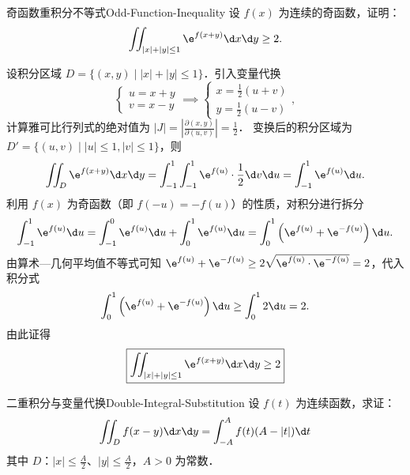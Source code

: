 \begin{problem}{奇函数重积分不等式}{Odd-Function-Inequality}
    设 $f(x)$ 为连续的奇函数，证明：
    \begin{equation}
        \iint_{|x|+|y| \le 1} \e^{f(x+y)} \d x \d y \ge 2.
    \end{equation}
\end{problem}

\begin{myproof}
    设积分区域 $D = \{ (x, y) \mid |x| + |y| \le 1 \}$．引入变量代换
    \begin{equation}
        \begin{cases} u = x + y \\ v = x - y \end{cases} \implies \begin{cases} x = \frac{1}{2}(u + v) \\ y = \frac{1}{2}(u - v) \end{cases},
    \end{equation}
    计算雅可比行列式的绝对值为 $|J| = \left| \frac{\partial(x, y)}{\partial(u, v)} \right| = \frac{1}{2}$．
    变换后的积分区域为 $D' = \{ (u, v) \mid |u| \le 1, |v| \le 1 \}$，则
    \begin{equation}
        \iint_D \e^{f(x+y)} \d x \d y = \int_{-1}^1 \int_{-1}^1 \e^{f(u)} \cdot \frac{1}{2} \d v \d u = \int_{-1}^1 \e^{f(u)} \d u.
    \end{equation}
    利用 $f(x)$ 为奇函数（即 $f(-u) = -f(u)$）的性质，对积分进行拆分
    \begin{equation}
        \int_{-1}^1 \e^{f(u)} \d u = \int_{-1}^0 \e^{f(u)} \d u + \int_0^1 \e^{f(u)} \d u = \int_0^1 \left( \e^{f(u)} + \e^{-f(u)} \right) \d u.
    \end{equation}
    由算术—几何平均值不等式可知 $\e^{f(u)} + \e^{-f(u)} \ge 2\sqrt{\e^{f(u)} \cdot \e^{-f(u)}} = 2$，代入积分式
    \begin{equation}
        \int_0^1 \left( \e^{f(u)} + \e^{-f(u)} \right) \d u \ge \int_0^1 2 \d u = 2.
    \end{equation}
    由此证得
    \begin{equation}
        \boxed{\iint_{|x|+|y| \le 1} \e^{f(x+y)} \d x \d y \ge 2}
    \end{equation}
\end{myproof}


\begin{problem}{二重积分与变量代换}{Double-Integral-Substitution}
    设 $f(t)$ 为连续函数，求证：
    \begin{equation}
        \iint_D f(x - y) \d x \d y = \int_{-A}^A f(t)(A - |t|) \d t
    \end{equation}
    其中 $D$：$|x| \le \frac{A}{2}$、$|y| \le \frac{A}{2}$，$A > 0$ 为常数．
\end{problem}

